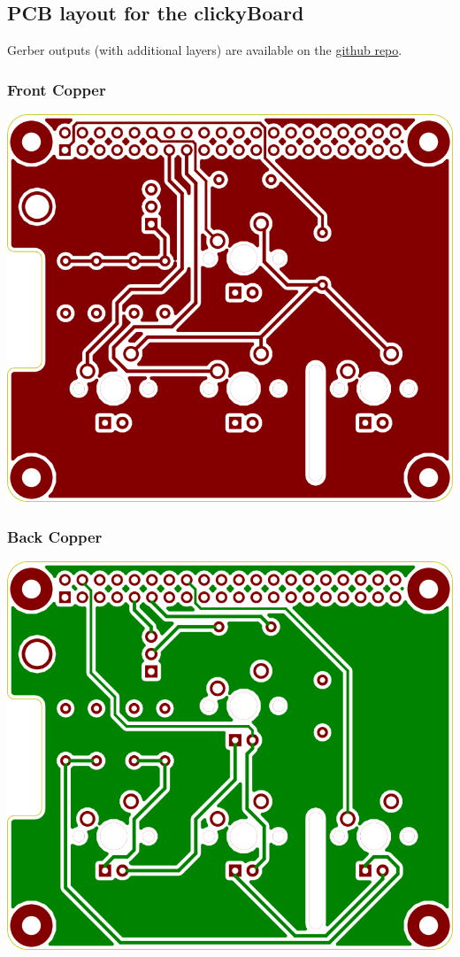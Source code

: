 \documentclass[10pt, a4paper, onesided]{article}
\begin{document}
	\newpage
	\subsection{PCB layout for the clickyBoard}
		Gerber outputs (with additional layers) are available on the \href{https://github.com/SecretImbecile/clickyBoard}{github repo}.
		\subsubsection*{Front Copper}
			\begin{center}
				\includegraphics[width=0.7\linewidth]{img/F_Cu}
			\end{center}
		\subsubsection*{Back Copper}
		\begin{center}
			\includegraphics[width=0.7\linewidth]{img/B_Cu}
		\end{center}
\end{document}
